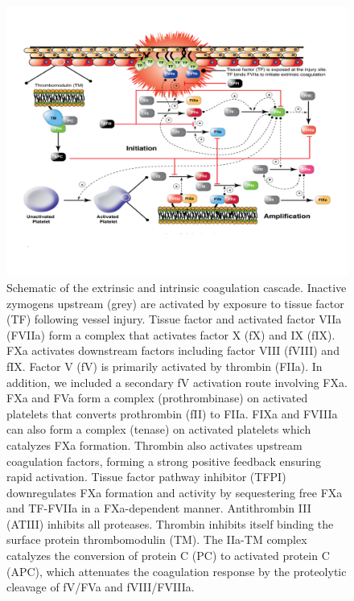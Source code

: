 \documentclass[12pt]{article}
\begin{document}
\begin{figure}[h]
\centering
\includegraphics[width=1.00\textwidth,height=0.7\textheight]{./figs/Figure_2_CoagulationNetwork.pdf}
\caption{Schematic of the extrinsic and intrinsic coagulation cascade\cite{luan2007computationally}. Inactive zymogens upstream (grey) are activated by exposure to tissue factor (TF)  following vessel injury. Tissue factor and activated factor VIIa (FVIIa) form a complex that activates factor X (fX) and IX (fIX). FXa activates downstream factors including factor VIII (fVIII) and fIX. Factor V (fV) is primarily activated by thrombin (FIIa). In addition, we included a secondary fV activation route involving FXa. FXa and FVa form a complex (prothrombinase) on activated platelets that converts prothrombin (fII) to FIIa. FIXa and FVIIIa can also form a complex (tenase) on activated platelets which catalyzes FXa formation.  Thrombin also activates upstream coagulation factors, forming a strong positive feedback ensuring rapid activation. Tissue factor pathway inhibitor (TFPI) downregulates FXa formation and activity by sequestering free FXa and TF-FVIIa in a FXa-dependent manner. Antithrombin III (ATIII)  inhibits all proteases. Thrombin inhibits itself binding the surface protein thrombomodulin (TM). The IIa-TM complex catalyzes the conversion of protein C (PC) to activated protein C (APC), which attenuates the coagulation response by the proteolytic cleavage of fV/FVa and fVIII/FVIIIa. }\label{fig-coagulation-network}
\end{figure}

\clearpage
\end{document}
